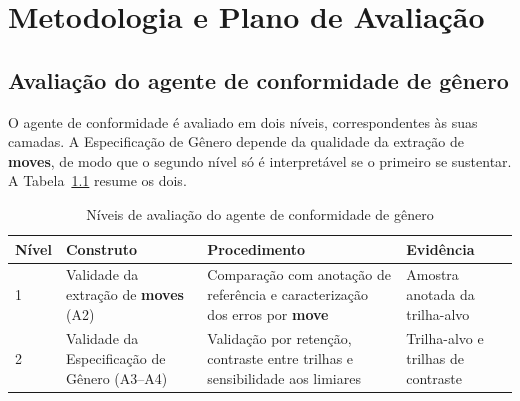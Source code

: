\chapter{Metodologia e Plano de Avaliação}\label{chap:metodologia_plano_avaliacao}





\section{Avaliação do agente de conformidade de gênero}
\label{sec:avaliacao-conformidade}

O agente de conformidade é avaliado em dois níveis, correspondentes às suas camadas. A Especificação de Gênero depende da qualidade da extração de \textbf{moves}, de modo que o segundo nível só é interpretável se o primeiro se sustentar. A Tabela~\ref{tab:niveis-conformidade} resume os dois.

\begin{table}[H]
\centering
\caption{Níveis de avaliação do agente de conformidade de gênero}
\label{tab:niveis-conformidade}
\small
\begin{tabular}{|p{1.0cm}|p{3.4cm}|p{5.4cm}|p{3.5cm}|}
\hline
\textbf{Nível} & \textbf{Construto} & \textbf{Procedimento} & \textbf{Evidência} \\
\hline
1 & Validade da extração de \textbf{moves} (A2) & Comparação com anotação de referência e caracterização dos erros por \textbf{move} & Amostra anotada da trilha-alvo \\
\hline
2 & Validade da Especificação de Gênero (A3--A4) & Validação por retenção, contraste entre trilhas e sensibilidade aos limiares & Trilha-alvo e trilhas de contraste \\
\hline
\end{tabular}
\end{table}

